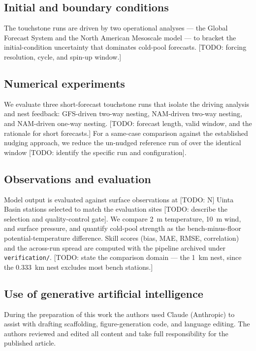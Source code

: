\documentclass[air,article,submit,pdftex,moreauthors]{Definitions/mdpi}
\begin{document}
\subsection{Initial and boundary conditions}
The touchstone runs are driven by two operational analyses --- the Global
Forecast System \citep{ncep2019gfs} and the North American Mesoscale model ---
to bracket the initial-condition uncertainty that dominates cold-pool forecasts.
[TODO: forcing resolution, cycle, and spin-up window.]

\subsection{Numerical experiments}
We evaluate three short-forecast touchstone runs that isolate the driving
analysis and nest feedback: GFS-driven two-way nesting, NAM-driven two-way
nesting, and NAM-driven one-way nesting.
[TODO: forecast length, valid window, and the rationale for short forecasts.]
For a same-case comparison against the established nudging approach, we reduce
the un-nudged reference run of \citet{tran2018} over the identical window
[TODO: identify the specific run and configuration].

\subsection{Observations and evaluation}
Model output is evaluated against surface observations at [TODO: N] Uinta Basin
stations selected to match the \citet{tran2018} evaluation sites
[TODO: describe the selection and quality-control gate].
We compare 2~m temperature, 10~m wind, and surface pressure, and quantify
cold-pool strength as the bench-minus-floor potential-temperature difference.
Skill scores (bias, MAE, RMSE, correlation) and the across-run spread are
computed with the pipeline archived under \texttt{verification/}.
[TODO: state the comparison domain --- the 1~km nest, since the 0.333~km nest
excludes most bench stations.]

\subsection{Use of generative artificial intelligence}
During the preparation of this work the authors used Claude (Anthropic) to
assist with drafting scaffolding, figure-generation code, and language editing.
The authors reviewed and edited all content and take full responsibility for
the published article.
\end{document}
